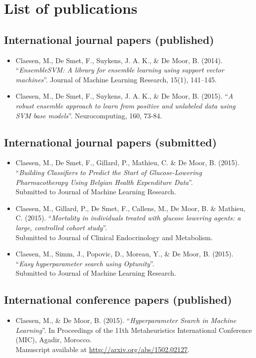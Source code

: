 \chapter{List of publications}

\section*{International journal papers (published)}

\begin{itemize}
\item Claesen, M., De Smet, F., Suykens, J. A. K., \& De Moor, B. (2014). ``\emph{EnsembleSVM: A library for ensemble learning using support vector machines}''. Journal of Machine Learning Research, 15(1), 141--145.
\item Claesen, M., De Smet, F., Suykens, J. A. K., \& De Moor, B. (2015). ``\emph{A robust ensemble approach to learn from positive and unlabeled data using SVM base models}''.
Neurocomputing, 160, 73-84.
\end{itemize}

\section*{International journal papers (submitted)}
\begin{itemize}
\item Claesen, M., De Smet, F., Gillard, P., Mathieu, C. \& De Moor, B. (2015). ``\emph{Building Classifiers to Predict the Start of Glucose-Lowering Pharmacotherapy Using Belgian Health Expenditure Data}''. \\ 
        Submitted to Journal of Machine Learning Research.
\item Claesen, M., Gillard, P., De Smet, F., Callens, M., De Moor, B. \& Mathieu, C. (2015). ``\emph{Mortality in individuals treated with glucose lowering agents: a large, controlled cohort study}''. \\ 
        Submitted to Journal of Clinical Endocrinology and Metabolism.
\item Claesen, M., Simm, J., Popovic, D., Moreau, Y., \& De Moor, B. (2015). ``\emph{Easy hyperparameter search using Optunity}''. \\
        Submitted to Journal of Machine Learning Research.
\end{itemize}

\section*{International conference papers (published)}
\begin{itemize}
\item Claesen, M., \& De Moor, B. (2015). ``\emph{Hyperparameter Search in Machine Learning}''. In Proceedings of the 11th Metaheuristics International Conference (MIC), Agadir, Morocco. \\ Manuscript available at \url{http://arxiv.org/abs/1502.02127}.
\end{itemize}

